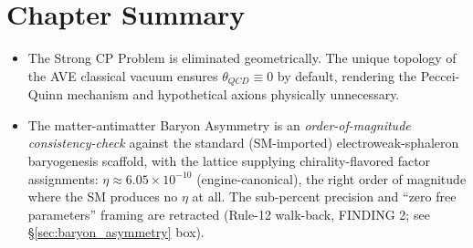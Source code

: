 \section*{Chapter Summary}
\begin{itemize}
    \item The Strong CP Problem is eliminated geometrically. The unique topology of the AVE classical vacuum ensures $\theta_{QCD} \equiv 0$ by default, rendering the Peccei-Quinn mechanism and hypothetical axions physically unnecessary.
    \item The matter-antimatter Baryon Asymmetry is an \emph{order-of-magnitude consistency-check} against the standard (SM-imported) electroweak-sphaleron baryogenesis scaffold, with the lattice supplying chirality-flavored factor assignments: $\eta \approx 6.05 \times 10^{-10}$ (engine-canonical), the right order of magnitude where the SM produces no $\eta$ at all. The sub-percent precision and ``zero free parameters'' framing are retracted (Rule-12 walk-back, FINDING 2; see \S\ref{sec:baryon_asymmetry} box).

\end{itemize}
